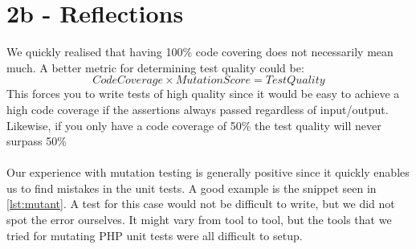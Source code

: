 \section*{2b - Reflections}
We quickly realised that having 100\% code covering does not necessarily mean much. A better metric for determining test quality could be: \[CodeCoverage \times MutationScore = TestQuality\] This forces you to write tests of high quality since it would be easy to achieve a high code coverage if the assertions always passed regardless of input/output.
Likewise, if you only have a code coverage of 50\% the test quality will never surpass 50\%\\\\
Our experience with mutation testing is generally positive since it quickly enables us to find mistakes in the unit tests. A good example is the snippet seen in \autoref{lst:mutant}. A test for this case would not be difficult to write, but we did not spot the error ourselves. It might vary from tool to tool, but the tools that we tried for mutating PHP unit tests were all difficult to setup.



